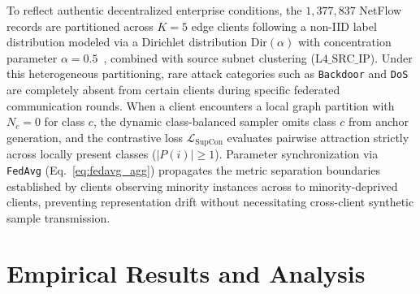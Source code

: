 \documentclass[journal,onecolumn]{IEEEtran}
\begin{document}
To reflect authentic decentralized enterprise conditions, the $1,377,837$ NetFlow records are partitioned across $K = 5$ edge clients following a non-IID label distribution modeled via a Dirichlet distribution $\text{Dir}(\alpha)$ with concentration parameter $\alpha = 0.5$~\cite{hsu2019noniid, zhao2018federated}, combined with source subnet clustering ($\text{L4\_SRC\_IP}$). Under this heterogeneous partitioning, rare attack categories such as \texttt{Backdoor} and \texttt{DoS} are completely absent from certain clients during specific federated communication rounds. When a client encounters a local graph partition with $N_c = 0$ for class $c$, the dynamic class-balanced sampler omits class $c$ from anchor generation, and the contrastive loss $\mathcal{L}_{\text{SupCon}}$ evaluates pairwise attraction strictly across locally present classes ($|P(i)| \ge 1$). Parameter synchronization via \texttt{FedAvg} (Eq.~\ref{eq:fedavg_agg}) propagates the metric separation boundaries established by clients observing minority instances across to minority-deprived clients, preventing representation drift without necessitating cross-client synthetic sample transmission.

\section{Empirical Results and Analysis}
\label{sec:results}
\end{document}
